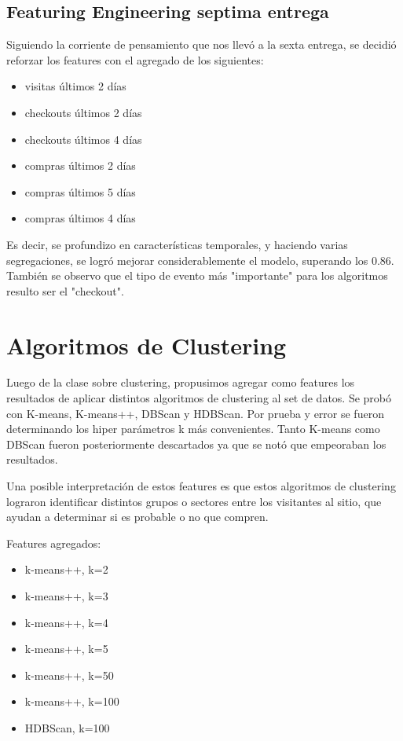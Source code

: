 \documentclass[a4paper ,12pt]{article}
\begin{document}
\subsection{Featuring Engineering septima entrega}

		Siguiendo la corriente de pensamiento que nos llevó a la sexta entrega, se decidió reforzar los features con el agregado de los siguientes:	
		
	
\begin{itemize}
	

	\item visitas últimos 2 días 
	\item checkouts últimos 2 días
	\item checkouts últimos 4 días
	\item compras últimos 2 días
	\item compras últimos 5 días
	\item compras últimos 4 días
	
	
\end{itemize}

Es decir, se profundizo en características temporales, y haciendo varias segregaciones, se logró mejorar considerablemente el modelo, superando los 0.86. También se observo que el tipo de evento más "importante" para los algoritmos resulto ser el "checkout".
 
\section{Algoritmos de Clustering}

Luego de la clase sobre clustering, propusimos agregar como features los resultados de aplicar distintos algoritmos de clustering al set de datos. Se probó con K-means, K-means++, DBScan y HDBScan. Por prueba y error se fueron determinando los hiper parámetros k más convenientes. Tanto K-means como DBScan fueron posteriormente descartados ya que se notó que empeoraban los resultados.

Una posible interpretación de estos features es que estos algoritmos de clustering lograron identificar distintos grupos o sectores entre los visitantes al sitio, que ayudan a determinar si es probable o no que compren.

Features agregados:
\begin{itemize}
	\item k-means++, k=2
	\item k-means++, k=3
	\item k-means++, k=4
	\item k-means++, k=5
	\item k-means++, k=50
	\item k-means++, k=100
	\item HDBScan, k=100
\end{itemize}
\end{document}
